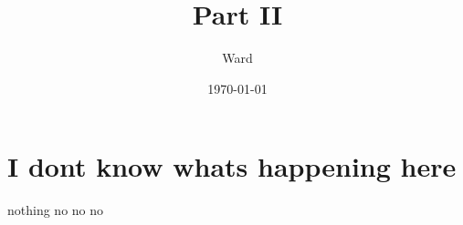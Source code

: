 \documentclass{beamer}
\title[Sometimes people do stupid things]{Part II}
\author{Ward}
\institute{Albert Ludwigs Universität Freiburg}
\date{\today}
\begin{document}
\frame{\titlepage}
\section{I dont know whats happening here}
\begin{frame}[t]{nothing}
    no no no 
\end{frame}
\end{document}
